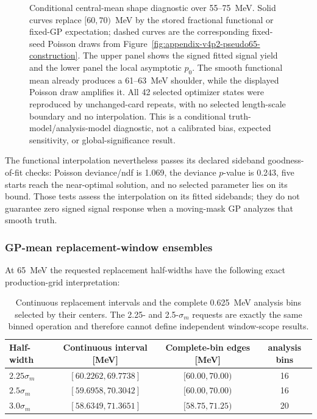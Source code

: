 \begin{figure}[H]
\centering
{}
\caption{Conditional central-mean shape diagnostic over 55--75~MeV.  Solid
curves replace $[60,70)$~MeV by the stored fractional functional or fixed-GP
expectation; dashed curves are the corresponding fixed-seed Poisson draws from
Figure~\ref{fig:appendix-v4p2-pseudo65-construction}.  The upper panel shows
the signed fitted signal yield and the lower panel the local asymptotic
$p_0$.  The smooth functional mean already produces a 61--63~MeV shoulder,
while the displayed Poisson draw amplifies it.  All 42 selected optimizer
states were reproduced by unchanged-card repeats, with no selected
length-scale boundary and no interpolation.  This is a conditional
truth-model/analysis-model diagnostic, not a calibrated bias, expected
sensitivity, or global-significance result.}
\label{fig:appendix-v4p2-functional-mean-shape}
\end{figure}

The functional interpolation nevertheless passes its declared sideband
goodness-of-fit checks: Poisson deviance/ndf is 1.069, the deviance
$p$-value is 0.243, five starts reach the near-optimal solution, and no
selected parameter lies on its bound.  Those tests assess the interpolation
on its fitted sidebands; they do not guarantee zero signed signal response
when a moving-mask GP analyzes that smooth truth.

\subsubsection{GP-mean replacement-window ensembles}

At 65~MeV the requested replacement half-widths have the following exact
production-grid interpretation:

\begin{table}[H]
\centering
\small
\caption{Continuous replacement intervals and the complete 0.625~MeV
analysis bins selected by their centers.  The 2.25- and 2.5-$\sigma_m$
requests are exactly the same binned operation and therefore cannot define
independent window-scope results.}
\label{tab:v4p2-pseudo65-window-geometry}
\begin{tabular}{lccc}
\toprule
Half-width & Continuous interval [MeV] & Complete-bin edges [MeV] &
analysis bins \\
\midrule
$2.25\sigma_m$ & $[60.2262,69.7738]$ & $[60.00,70.00)$ & 16 \\
$2.5\sigma_m$  & $[59.6958,70.3042]$ & $[60.00,70.00)$ & 16 \\
$3.0\sigma_m$  & $[58.6349,71.3651]$ & $[58.75,71.25)$ & 20 \\
\bottomrule
\end{tabular}
\end{table}

